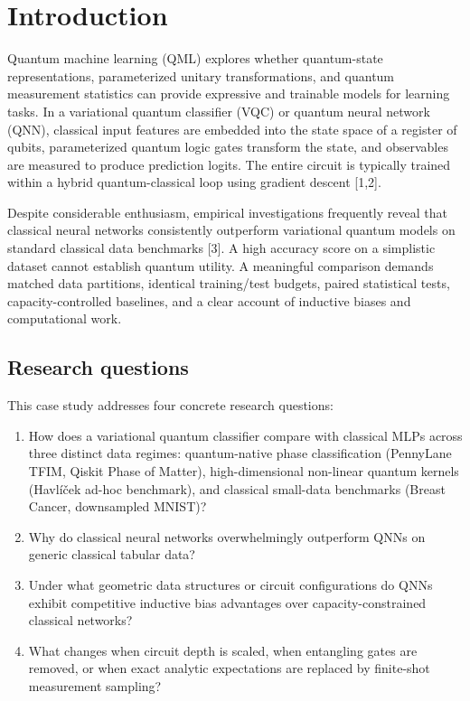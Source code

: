 \section{Introduction}
Quantum machine learning (QML) explores whether quantum-state representations, parameterized unitary transformations, and quantum measurement statistics can provide expressive and trainable models for learning tasks. In a variational quantum classifier (VQC) or quantum neural network (QNN), classical input features are embedded into the state space of a register of qubits, parameterized quantum logic gates transform the state, and observables are measured to produce prediction logits. The entire circuit is typically trained within a hybrid quantum-classical loop using gradient descent [1,2].

Despite considerable enthusiasm, empirical investigations frequently reveal that classical neural networks consistently outperform variational quantum models on standard classical data benchmarks [3]. A high accuracy score on a simplistic dataset cannot establish quantum utility. A meaningful comparison demands matched data partitions, identical training/test budgets, paired statistical tests, capacity-controlled baselines, and a clear account of inductive biases and computational work.

\subsection{Research questions}
This case study addresses four concrete research questions:
\begin{enumerate}
  \item How does a variational quantum classifier compare with classical MLPs across three distinct data regimes: quantum-native phase classification (PennyLane TFIM, Qiskit Phase of Matter), high-dimensional non-linear quantum kernels (Havl\'i\v{c}ek ad-hoc benchmark), and classical small-data benchmarks (Breast Cancer, downsampled MNIST)?
  \item Why do classical neural networks overwhelmingly outperform QNNs on generic classical tabular data?
  \item Under what geometric data structures or circuit configurations do QNNs exhibit competitive inductive bias advantages over capacity-constrained classical networks?
  \item What changes when circuit depth is scaled, when entangling gates are removed, or when exact analytic expectations are replaced by finite-shot measurement sampling?
\end{enumerate}

